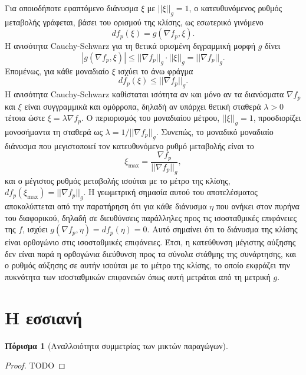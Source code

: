 \documentclass[11pt,a4paper,twoside,openright]{book}
\newtheorem{corollary}[lemma]{Πόρισμα}
\begin{document}
Για οποιοδήποτε εφαπτόμενο διάνυσμα \(\xi\) με \(||\xi||_g = 1\), ο κατευθυνόμενος ρυθμός μεταβολής γράφεται, βάσει του ορισμού της κλίσης, ως εσωτερικό γινόμενο
\[
df_p(\xi) = g(\nabla f_p, \xi).
\]
Η ανισότητα Cauchy-Schwarz για τη θετικά ορισμένη διγραμμική μορφή \(g\) δίνει
\[
|g(\nabla f_p, \xi)| \le ||\nabla f_p||_g \cdot ||\xi||_g = ||\nabla f_p||_g.
\]
Επομένως, για κάθε μοναδιαίο \(\xi\) ισχύει το άνω φράγμα
\[
df_p(\xi) \le ||\nabla f_p||_g.
\]
Η ανισότητα Cauchy-Schwarz καθίσταται ισότητα αν και μόνο αν τα διανύσματα \(\nabla f_p\) και \(\xi\) είναι συγγραμμικά και ομόρροπα, δηλαδή αν υπάρχει θετική σταθερά \(\lambda > 0\) τέτοια ώστε \(\xi = \lambda \nabla f_p\). Ο περιορισμός του μοναδιαίου μέτρου, \(||\xi||_g = 1\), προσδιορίζει μονοσήμαντα τη σταθερά ως \(\lambda = 1/||\nabla f_p||_g\). Συνεπώς, το μοναδικό μοναδιαίο διάνυσμα που μεγιστοποιεί τον κατευθυνόμενο ρυθμό μεταβολής είναι το
\[
\xi_{\text{max}} = \frac{\nabla f_p}{||\nabla f_p||_g},
\]
και ο μέγιστος ρυθμός μεταβολής ισούται με το μέτρο της κλίσης, \(df_p(\xi_{\text{max}}) = ||\nabla f_p||_g\). Η γεωμετρική σημασία αυτού του αποτελέσματος αποκαλύπτεται από την παρατήρηση ότι για κάθε διάνυσμα \(\eta\) που ανήκει στον πυρήνα του διαφορικού, δηλαδή σε διευθύνσεις παράλληλες προς τις ισοσταθμικές επιφάνειες της \(f\), ισχύει \(g(\nabla f_p, \eta) = df_p(\eta) = 0\). Αυτό σημαίνει ότι το διάνυσμα της κλίσης είναι ορθογώνιο στις ισοσταθμικές επιφάνειες. Έτσι, η κατεύθυνση μέγιστης αύξησης δεν είναι παρά η ορθογώνια διεύθυνση προς τα σύνολα στάθμης της συνάρτησης, και ο ρυθμός αύξησης σε αυτήν ισούται με το μέτρο της κλίσης, το οποίο εκφράζει την πυκνότητα των ισοσταθμικών επιφανειών όπως αυτή μετράται από τη μετρική \(g\).

\section{Η εσσιανή}

\begin{corollary}[Αναλλοιότητα συμμετρίας των μικτών παραγώγων]
\end{corollary}

\begin{proof}
TODO
\end{proof}
\end{document}
